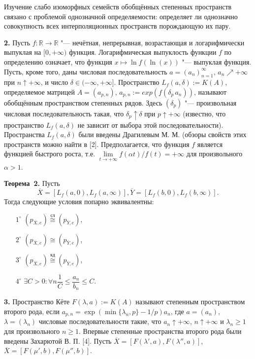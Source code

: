Изучение слабо изоморфных семейств обобщённых степенных про\-ст\-ранств связано с проблемой однозначной
определяемости: определяет ли однозначно совокупность всех интерполяционных пространств
порождающую их пару.

{\bf 2. }Пусть $f:{\mathbb R}\to{\mathbb R}$ "--- нечётная, непрерывная, возрастающая и логарифмически выпуклая
на $[0,+\infty )$ функция. Логарифмическая выпуклость функции $f$  по определению означает, что функция
$x\mapsto \ln f(\ln(x))$ "--- выпуклая функция. Пусть, кроме того, даны числовая последовательность
$a=(a_{n})_{n=1}^{\infty }$, $a_n\nearrow +\infty $ при $n\uparrow +\infty $,
и число $\delta \in (-\infty ,+\infty ]$.   Пространство $L_{f}(a,\delta ):=K(A)$,  определяемое
матрицей $A=(a_{p,n})$, $a_{p,n}:= exp (f(\delta_p\, a_n))$,
называют обобщённым пространством степенных рядов.
Здесь $(\delta_p)$ "--- произвольная
числовая последовательность такая, что $\delta_p \uparrow \delta  $ при $p\uparrow +\infty $
(известно, что пространство $L_{f}(a,\delta )$ не зависит от выбора этой последовательности). Пространства $L_{f}(a,\delta )$
были введены Драгилевым М. М. (обзоры свойств этих пространств можно найти в [2].
Предполагается, что функция $f$ является функцией быстрого роста, т.е.
$\lim\limits_{t\to +\infty }f(\alpha t)/f(t)=+\infty $ для произвольного $\alpha >1$.

\noindent\textbf{Теорема~2.}
Пусть
$$
\overline{X}=[L_{f}(a,0),L_{f}(a,\infty )], \overline{Y}=[L_{f}(b,0),L_{f}(b,\infty )].
$$
Тогда следующие условия попарно эквивалентны:
\begin{itemize}
\item[$1^{\circ}$] $(p_{\overline{X},e})\stackrel{\text{сл}}{\cong}(p_{\overline{Y},e})$,
\item[$2^{\circ}$] $(p_{\overline{X},e})\cong(p_{\overline{Y},e})$,
\item[$3^{\circ}$] $(p_{\overline{X},e})\stackrel{\text{кд}}{\cong}(p_{\overline{Y},e})$,
\item[$4^{\circ}$] $\exists{C>0:}\forall{n} \dfrac{1}{C}\leqslant \dfrac{a_{n}}{b_{n}}\leqslant C$.
\end{itemize}

{\bf 3. }Пространство Кёте $F(\lambda ,a):=K(A)$ называют степенным пространством второго рода, если
$a_{p,n}=\exp(\min\{\lambda_n,p \}-1/p)a_{n}$, где $a=(a_n)$, $\lambda=(\lambda_n)$ числовые
последовательности такие, что $a_n\uparrow +\infty $, $n\uparrow +\infty $ и $\lambda_n\geqslant 1$ для
произвольного $n\geqslant 1$. Впервые степенные пространства
второго рода были введены Захарютой В. П. [4].
Пусть $\overline{X}=[F(\lambda',a),F(\lambda'',a)]$, $\overline{X}=[F(\mu',b),F(\mu'',b)]$.

